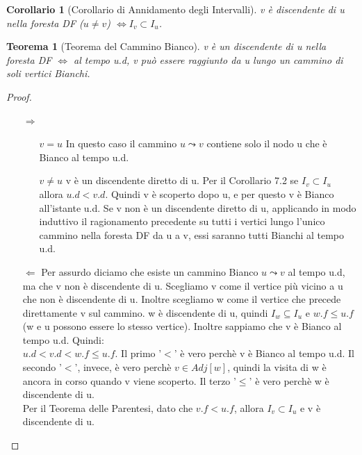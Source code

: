 \documentclass{article}
\newtheorem{theorem}{Teorema}[section]
\newtheorem{corollary}{Corollario}[section]
\begin{document}
\begin{corollary}[Corollario di Annidamento degli Intervalli]
    v è discendente di u nella foresta DF ($u \neq v$) $\Leftrightarrow I_v \subset I_u$.
\end{corollary}

\begin{theorem}[Teorema del Cammino Bianco]
    v è un discendente di u nella foresta DF $\Leftrightarrow$ al tempo u.d, v può essere raggiunto da u lungo un cammino di soli vertici Bianchi.
\end{theorem}

\begin{proof}
    $ $
    \begin{itemize}
        \item[$\Rightarrow$]$ $
            \begin{itemize}
                \item[$v = u$] In questo caso il cammino $u \leadsto v$ contiene solo il nodo u che è Bianco al tempo u.d.
                \item[$v \neq u$] v è un discendente diretto di u. Per il Corollario 7.2 se $I_v \subset I_u$ allora $u.d < v.d$. Quindi v è scoperto dopo u, e per questo v è Bianco all'istante u.d. Se v non è un discendente diretto di u, applicando in modo induttivo il ragionamento precedente su tutti i vertici lungo l'unico cammino nella foresta DF da u a v, essi saranno tutti Bianchi al tempo u.d.
            \end{itemize} 
        \item[$\Leftarrow$] Per assurdo diciamo che esiste un cammino Bianco $u \leadsto v$ al tempo u.d, ma che v non è discendente di u.
            Scegliamo v come il vertice più vicino a u che non è discendente di u. Inoltre scegliamo w come il vertice che precede direttamente v sul cammino.
            w è discendente di u, quindi $I_w \subseteq I_u$ e $w.f \leq u.f$ (w e u possono essere lo stesso vertice). Inoltre sappiamo che v è Bianco al tempo u.d. Quindi: \\
            $u.d < v.d < w.f \leq u.f$. Il primo '$<$' è vero perchè v è Bianco al tempo u.d. Il secondo '$<$', invece, è vero perchè $v \in Adj[w]$, quindi la visita di w è ancora in corso quando v viene scoperto.
            Il terzo '$\leq$' è vero perchè w è discendente di u. \\
            Per il Teorema delle Parentesi, dato che $v.f < u.f$, allora $I_v \subset I_u$ e v è discendente di u. \lightning
    \end{itemize}
\end{proof}
\end{document}
